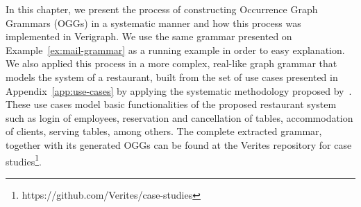 In this chapter, we present the process of constructing Occurrence Graph Grammars (OGGs) in a systematic manner and how this process was implemented in Verigraph. We use the same grammar presented on Example~\ref{ex:mail-grammar} as a running example in order to easy explanation. We also applied this process in a more complex, real-like graph grammar that models the system of a restaurant, built from the set of use cases presented in Appendix~\ref{app:use-cases} by applying the systematic methodology proposed
by~\cite{Junior2015}. These use cases model basic functionalities of the proposed restaurant system such as login of employees, reservation and cancellation of tables, accommodation of clients, serving tables, among others. The complete extracted grammar, together with its generated OGGs can be found at the Verites repository for case studies\footnote{https://github.com/Verites/case-studies}.

